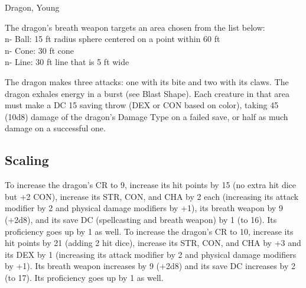 \begin{DndMonster}[float*=b,width=\textwidth + 8pt]{Dragon, Young}
\begin{multicols}{2}
 The dragon's breath weapon targets an area chosen from the list below:\\n- Ball: 15 ft radius sphere centered on a point within 60 ft\\n- Cone: 30 ft cone\\n- Line: 30 ft line that is 5 ft wide

 The dragon makes three attacks: one with its bite and two with its claws.
\DndMonsterAttack[
	name=Bite,
	distance=melee,
	type=weapon,
	mod=+8,
	reach=10,
	dmg=\DndDice{2d10 + 5},
	dmg-type=piercing,
	extra={ plus 4 (1d8) damage of the dragon's Damage Type.}
]
\DndMonsterAttack[
	name=Claw,
	distance=melee,
	type=weapon,
	mod=+8,
	reach=5,
	dmg=\DndDice{2d6 + 5},
	dmg-type=slashing
]
The dragon exhales energy in a burst (see Blast Shape). Each creature in that area must make a DC 15 saving throw (DEX or CON based on color), taking 45 (10d8) damage of the dragon's Damage Type on a failed save, or half as much damage on a successful one.
\subsection{Scaling}
To increase the dragon's CR to 9, increase its hit points by 15 (no extra hit dice but +2 CON), increase its STR, CON, and CHA by 2 each (increasing its attack modifier by 2 and physical damage modifiers by +1), its breath weapon by 9 (+2d8), and its save DC (spellcasting and breath weapon) by 1 (to 16). Its proficiency goes up by 1 as well.
To increase the dragon's CR to 10, increase its hit points by 21 (adding 2 hit dice), increase its STR, CON, and CHA by +3 and its DEX by 1 (increasing its attack modifier by 2 and physical damage modifiers by +1). Its breath weapon increases by 9 (+2d8) and its save DC increases by 2 (to 17). Its proficiency goes up by 1 as well.
\end{multicols}
\end{DndMonster}

